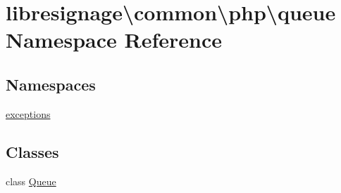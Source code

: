 \hypertarget{namespacelibresignage_1_1common_1_1php_1_1queue}{}\section{libresignage\textbackslash{}common\textbackslash{}php\textbackslash{}queue Namespace Reference}
\label{namespacelibresignage_1_1common_1_1php_1_1queue}
\subsection*{Namespaces}
\begin{DoxyCompactItemize}
\item 
 \hyperlink{namespacelibresignage_1_1common_1_1php_1_1queue_1_1exceptions}{exceptions}
\end{DoxyCompactItemize}
\subsection*{Classes}
\begin{DoxyCompactItemize}
\item 
class \hyperlink{classlibresignage_1_1common_1_1php_1_1queue_1_1Queue}{Queue}
\end{DoxyCompactItemize}

